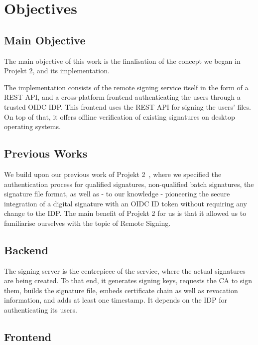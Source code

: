 \chapter{Objectives}
\label{ch:objectives}

\section{Main Objective}\label{subsec:main-objective}
The main objective of this work is the finalisation of the concept we began in Projekt 2,
and its implementation.

The implementation consists of the remote signing service itself in the form of a \gls{REST} \gls{API},
and a cross-platform frontend authenticating the users through a trusted \gls{OIDC} \gls{IDP}.
This frontend uses the \gls{REST} \gls{API} for signing the users' files.
On top of that, it offers offline verification of existing signatures on desktop operating systems.

\section{Previous Works}
\label{section:previousworks}

We build upon our previous work of Projekt 2~\cite{projekt2}, where we specified the authentication process
for qualified signatures, non-qualified batch signatures, the signature file format,
as well as - to our knowledge - pioneering the secure integration of a digital signature with an \gls{OIDC} ID token without requiring any change to the \gls{IDP}.
The main benefit of Projekt 2 for us is that it allowed us to familiarise ourselves with the topic of Remote Signing.


\section{Backend}
\label{section:backend}

The signing server is the centrepiece of the service, where the actual signatures are being created.
To that end, it generates signing keys,
requests the \gls{CA} to sign them,
builds the signature file, embeds certificate chain as well as revocation information,
and adds at least one timestamp.
It depends on the \gls{IDP} for authenticating its users.

\section{Frontend}
\label{section:frontend}

